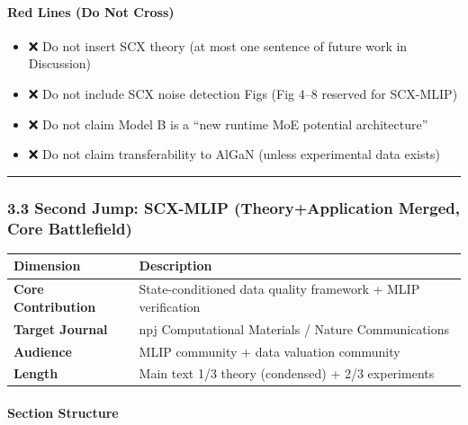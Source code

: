 \documentclass[
  12pt,
]{article}
\providecommand{\tightlist}{%
  \setlength{\itemsep}{0pt}\setlength{\parskip}{0pt}}
\begin{document}
\paragraph{Red Lines (Do Not Cross)}\label{red-lines-do-not-cross}

\begin{itemize}
\tightlist
\item
  ❌ Do not insert SCX theory (at most one sentence of future work in Discussion)
\item
  ❌ Do not include SCX noise detection Figs (Fig 4--8 reserved for SCX-MLIP)
\item
  ❌ Do not claim Model B is a ``new runtime MoE potential architecture''
\item
  ❌ Do not claim transferability to AlGaN (unless experimental data exists)
\end{itemize}

\begin{center}\rule{0.5\linewidth}{0.5pt}\end{center}

\subsubsection{3.3 Second Jump: SCX-MLIP (Theory+Application Merged, Core Battlefield)}\label{second-jump-scx-mlip-theory-application-merged}

\begin{longtable}[]{@{}ll@{}}
\toprule\noalign{}
Dimension & Description \\
\midrule\noalign{}
\endhead
\bottomrule\noalign{}
\endlastfoot
\textbf{Core Contribution} & State-conditioned data quality framework + MLIP verification \\
\textbf{Target Journal} & npj Computational Materials / Nature Communications \\
\textbf{Audience} & MLIP community + data valuation community \\
\textbf{Length} & Main text 1/3 theory (condensed) + 2/3 experiments \\
\end{longtable}

\paragraph{Section Structure}\label{section-structure-1}
\end{document}
